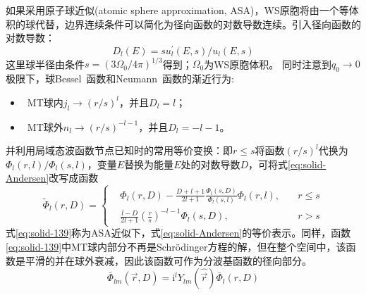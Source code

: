 如果采用原子球近似(atomic sphere approximation, ASA)，WS原胞将由一个等体积的球代替，边界连续条件可以简化为径向函数的对数导数连续。引入径向函数的对数导数：
\begin{equation}
  D_l(E)=su_l^{\prime}(E,s)/u_l(E,s)
  \label{eq:solid-132}
\end{equation}
这里球半径由条件$s=(3\Omega_0/4\pi)^{1/3}$得到；$\Omega_0$为WS原胞体积。
同时注意到$q_0\rightarrow0$极限下，球\textrm{Bessel~}函数和\textrm{Neumann~}函数的渐近行为:
\begin{itemize}
	\item ~MT球内$j_l\rightarrow(r/s)^l$，并且$D_l=l$；
	\item ~MT球外$n_l\rightarrow(r/s)^{-l-1}$，并且$D_l=-l-1$。
\end{itemize}
并利用局域态波函数节点已知时的常用等价变换：即$r\leqslant s$将函数$(r/s)^l$代换为$\Phi_l(r,l)/\Phi_l(s,l)$，变量$E$替换为能量$E$处的对数导数$D$，可将式\eqref{eq:solid-Andersen}改写成函数
\begin{equation}
   \tilde\Phi_l(r,D)=\left\{
  \begin{aligned}
    &\Phi_l(r,D)-\frac{D+l+1}{2l+1}\frac{\Phi_l(s,D)}{\Phi_l(s,l)}\Phi_l(r,l),\quad&r\leqslant s\\
    &\frac{l-D}{2l+1}\left(\frac rs\right)^{-l-1}\Phi_l(s,D),&r>s
  \end{aligned}\right.
 \label{eq:solid-139}
\end{equation}
式\eqref{eq:solid-139}称为ASA近似下，式\eqref{eq:solid-Andersen}的等价表示。同样，函数\eqref{eq:solid-139}中MT球内部分不再是Schr\"odinger方程的解，但在整个空间中，该函数是平滑的并在球外衰减，因此该函数可作为分波基函数的径向部分。%
\begin{equation}
	\bar\Phi_{lm}(\vec r,D)=\mathrm{i}^lY_{lm}(\hat{\vec r})\bar\Phi_l(r,D)
  \label{eq:solid-140}
\end{equation}

